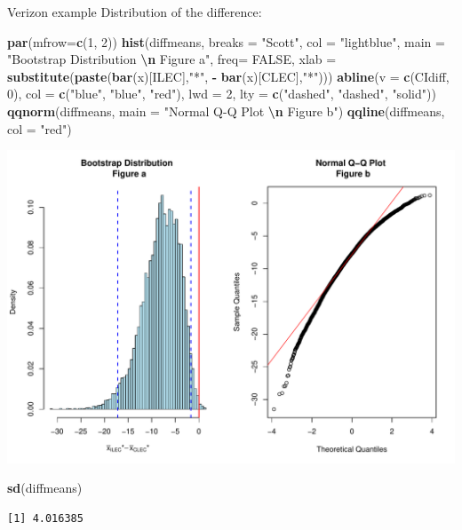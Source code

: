 \documentclass[
  ignorenonframetext,
]{beamer}
\newenvironment{Shaded}{\begin{snugshade}}{\end{snugshade}}
\newcommand{\AttributeTok}[1]{\textcolor[rgb]{0.13,0.29,0.53}{#1}}
\newcommand{\ConstantTok}[1]{\textcolor[rgb]{0.56,0.35,0.01}{#1}}
\newcommand{\DecValTok}[1]{\textcolor[rgb]{0.00,0.00,0.81}{#1}}
\newcommand{\FunctionTok}[1]{\textcolor[rgb]{0.13,0.29,0.53}{\textbf{#1}}}
\newcommand{\NormalTok}[1]{#1}
\newcommand{\SpecialCharTok}[1]{\textcolor[rgb]{0.81,0.36,0.00}{\textbf{#1}}}
\newcommand{\StringTok}[1]{\textcolor[rgb]{0.31,0.60,0.02}{#1}}
\begin{document}
\begin{frame}[fragile]{Verizon example}
\protect\hypertarget{verizon-example-7}{}
Distribution of the difference:

\tiny

\begin{Shaded}
\begin{Highlighting}[]
\FunctionTok{par}\NormalTok{(}\AttributeTok{mfrow=}\FunctionTok{c}\NormalTok{(}\DecValTok{1}\NormalTok{, }\DecValTok{2}\NormalTok{))}
\FunctionTok{hist}\NormalTok{(diffmeans, }\AttributeTok{breaks =} \StringTok{"Scott"}\NormalTok{, }\AttributeTok{col =} \StringTok{"lightblue"}\NormalTok{, }
     \AttributeTok{main =} \StringTok{"Bootstrap Distribution }\SpecialCharTok{\textbackslash{}n}\StringTok{ Figure a"}\NormalTok{, }
     \AttributeTok{freq=} \ConstantTok{FALSE}\NormalTok{, }\AttributeTok{xlab =} \FunctionTok{substitute}\NormalTok{(}\FunctionTok{paste}\NormalTok{(}\FunctionTok{bar}\NormalTok{(x)[ILEC],}\StringTok{"*"}\NormalTok{, }\SpecialCharTok{{-}} \FunctionTok{bar}\NormalTok{(x)[CLEC],}\StringTok{"*"}\NormalTok{)))}
\FunctionTok{abline}\NormalTok{(}\AttributeTok{v =} \FunctionTok{c}\NormalTok{(CIdiff, }\DecValTok{0}\NormalTok{), }\AttributeTok{col =} \FunctionTok{c}\NormalTok{(}\StringTok{"blue"}\NormalTok{, }\StringTok{"blue"}\NormalTok{, }\StringTok{"red"}\NormalTok{), }\AttributeTok{lwd =} \DecValTok{2}\NormalTok{, }
       \AttributeTok{lty =} \FunctionTok{c}\NormalTok{(}\StringTok{"dashed"}\NormalTok{, }\StringTok{"dashed"}\NormalTok{, }\StringTok{"solid"}\NormalTok{))}
\FunctionTok{qqnorm}\NormalTok{(diffmeans, }\AttributeTok{main =} \StringTok{"Normal Q{-}Q Plot }\SpecialCharTok{\textbackslash{}n}\StringTok{ Figure b"}\NormalTok{)}
\FunctionTok{qqline}\NormalTok{(diffmeans, }\AttributeTok{col =} \StringTok{"red"}\NormalTok{)}
\end{Highlighting}
\end{Shaded}

\begin{center}\includegraphics[width=0.6\linewidth,height=0.4\textheight]{Week10_Lect_files/figure-beamer/unnamed-chunk-37-1} \end{center}

\begin{Shaded}
\begin{Highlighting}[]
\FunctionTok{sd}\NormalTok{(diffmeans)}
\end{Highlighting}
\end{Shaded}

\begin{verbatim}
[1] 4.016385
\end{verbatim}

\normalsize
\end{frame}
\end{document}
